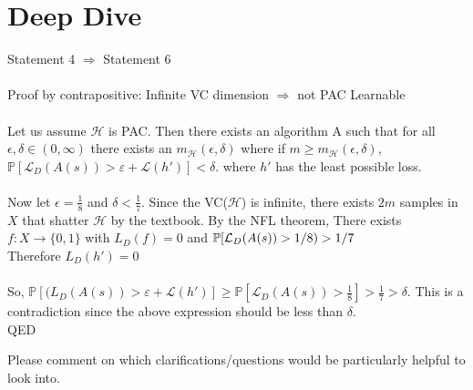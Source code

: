 \documentclass{article}
\begin{document}
\section{Deep Dive}
Statement 4 $\Rightarrow$ Statement 6 \\ \\
Proof by contrapositive: Infinite VC dimension $\Rightarrow$ not PAC Learnable \\ \\
Let us assume $\mathcal{H}$ is PAC. Then there exists an algorithm A such that for all $\epsilon, \delta \in (0,\infty)$ there exists an $m_{\mathcal{H}}(\epsilon, \delta)$ where if $m \geq m_{\mathcal{H}}(\epsilon, \delta)$, ${\mathbb{P}}\left[\mathcal{L}_D(A(s))>\varepsilon + \mathcal{L}(h')\right]<\delta \text{.}$ where $h'$ has the least possible loss.\\ \\ 
Now let $\epsilon = \frac{1}{8}$ and $\delta < \frac{1}{7}$. Since the VC($\mathcal{H}$) is infinite, there exists $2m$ samples in $X$ that shatter $\mathcal{H}$ by the textbook.
By the NFL theorem, There exists \( f : X \rightarrow \{0,1\} \)  with  ${{L}_D(f)= 0 }$ and ${\mathbb{P}} [\mathcal{L}_D(A(s)) > 1/8) > 1/7\\$
\\ Therefore ${{L}_D(h')= 0 }$ \\ \\ 
So, ${\mathbb{P}}\left[\mathcal({L}_D(A(s))>\varepsilon + \mathcal{L}(h')\right] \geq {\mathbb{P}}\left[\mathcal{L}_D(A(s))>\frac{1}{8}\right] > \frac{1}{7} > \delta$. This is a contradiction since the above expression should be less than $\delta$. \\
QED

Please comment on which clarifications/questions would be particularly helpful to look into.
\end{document}
